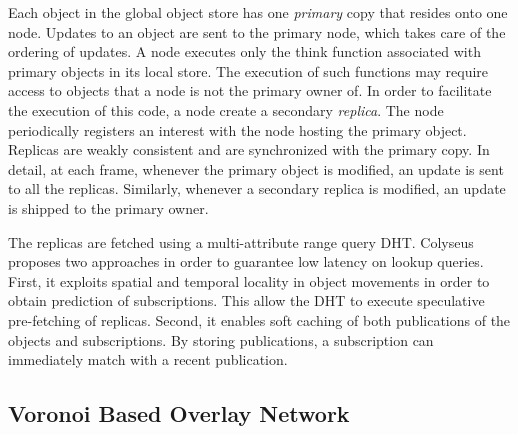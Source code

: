 \documentclass[final,10pt,a5paper]{phdimt}
\theoremstyle{definition}
\begin{document}
Each object in the global object store has one \textit{primary} copy that resides onto one node. Updates to an object are sent to the primary node, which takes care of the ordering of updates.
A node executes only the think function associated with primary objects in its local store. The execution of such functions may require access to objects that a node is not the primary owner of. In order to facilitate the execution of this code, a node create a secondary \textit{replica}. The node periodically registers an interest with the node hosting the primary object. Replicas are weakly consistent and are synchronized with the primary copy. In detail, at each frame, whenever the primary object is modified, an update is sent to all the replicas. Similarly, whenever a secondary replica is modified, an update is shipped to the primary owner.

The replicas are fetched using a multi-attribute range query DHT. Colyseus proposes two approaches in order to guarantee low latency on lookup queries. First, it exploits spatial and temporal locality in object movements in order to obtain prediction of subscriptions. This allow the DHT to execute speculative pre-fetching of replicas. 
Second, it enables soft caching of both publications of the objects and subscriptions. By storing publications, a subscription can immediately match with a recent publication. 

\subsection{Voronoi Based Overlay Network}
\label{sec-von}
\end{document}

